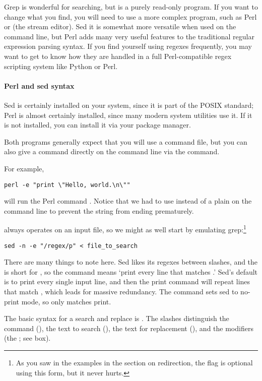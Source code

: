 Grep is wonderful for searching, but is a purely read-only program. If
you want to change what you find, you will need to use a more complex
program, such as Perl or  (the stream editor). Sed it is
somewhat more versatile when used on the command line, but Perl
adds many very useful features to the traditional regular expression
parsing syntax. If you find yourself using regexes frequently, you may
want to get to know how they are handled in a full Perl-compatible regex
scripting system like Python or Perl.

\paragraph{Perl and sed syntax} 
Sed is certainly installed on your system, since it is part of the
POSIX standard; Perl is almost certainly installed, since many modern
system utilities use it. If it is not installed, you can install it via
your package manager.

Both programs generally expect that you will use a command file, but you
can also give a command directly on the command line via the 
command.

For example,
\begin{lstlisting}
perl -e "print \"Hello, world.\n\""
\end{lstlisting}
will run the Perl command . Notice
that we had to use  instead of a plain  on the
command line to prevent the string from ending prematurely.

 always operates on an input file, so we might as well start by 
emulating grep:\footnote{As you saw in the  examples in the
section on redirection, the  flag is optional using this form,
but it never hurts.}
\label{sedintro}
\begin{lstlisting}
sed -n -e "/regex/p" < file_to_search
\end{lstlisting}
There are many things to note here. Sed likes its regexes between
slashes, and the  is short for , so the command
 means `print every line that matches .'
Sed's default is to print every single input line, and then the print
command will repeat lines that match , which leads for massive
redundancy. The  command sets sed to no-print mode, so only
matches print.

The basic syntax for a search and replace is .
The slashes distinguish the command (), the text to search
(), the text for replacement (), and the
modifiers (the ; see box).

